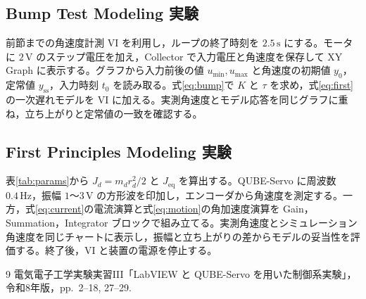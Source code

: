 \documentclass[dvipdfmx,a4paper,11pt]{jsarticle}
\begin{document}
\clearpage
\subsection{Bump Test Modeling 実験}
前節までの角速度計測 VI を利用し，ループの終了時刻を $2.5\,\mathrm{s}$ にする。モータに $2\,\mathrm{V}$ のステップ電圧を加え，Collector で入力電圧と角速度を保存して XY Graph に表示する。グラフから入力前後の値 $u_{\min},u_{\max}$ と角速度の初期値 $y_0$，定常値 $y_{\mathrm{ss}}$，入力時刻 $t_0$ を読み取る。式\eqref{eq:bump}で $K$ と $\tau$ を求め，式\eqref{eq:first}の一次遅れモデルを VI に加える。実測角速度とモデル応答を同じグラフに重ね，立ち上がりと定常値の一致を確認する。

\subsection{First Principles Modeling 実験}
表\ref{tab:params}から $J_d=m_dr_d^2/2$ と $J_{\mathrm{eq}}$ を算出する。QUBE-Servo に周波数 $0.4\,\mathrm{Hz}$，振幅 $1$～$3\,\mathrm{V}$ の方形波を印加し，エンコーダから角速度を測定する。一方，式\eqref{eq:current}の電流演算と式\eqref{eq:motion}の角加速度演算を Gain，Summation，Integrator ブロックで組み立てる。実測角速度とシミュレーション角速度を同じチャートに表示し，振幅と立ち上がりの差からモデルの妥当性を評価する。終了後，VI と装置の電源を停止する。

\begin{thebibliography}{9}
 電気電子工学実験実習III「LabVIEW と QUBE-Servo を用いた制御系実験」，令和8年版，pp.~2--18, 27--29.
\end{thebibliography}
\end{document}
